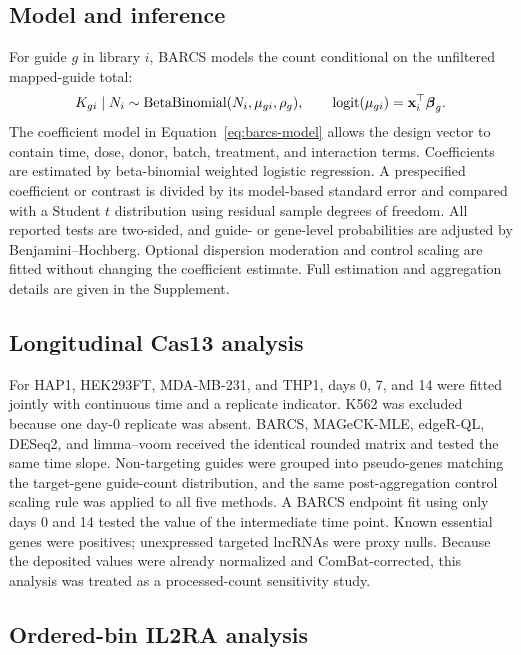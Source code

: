 \subsection{Model and inference}

For guide $g$ in library $i$, BARCS models the count conditional on the
unfiltered mapped-guide total:
\begin{equation}
K_{gi}\mid N_i\sim
\operatorname{BetaBinomial}(N_i,\mu_{gi},\rho_g),
\qquad
\operatorname{logit}(\mu_{gi})=\mathbf{x}_i^\top\boldsymbol{\beta}_g .
\label{eq:barcs-model}
\end{equation}
The coefficient model in Equation~\eqref{eq:barcs-model} allows the design
vector to contain time, dose, donor, batch, treatment, and
interaction terms.  Coefficients are estimated by beta-binomial weighted
logistic regression.  A prespecified coefficient or contrast is divided by
its model-based standard error and compared with a Student $t$ distribution
using residual sample degrees of freedom.  All reported tests are two-sided,
and guide- or gene-level probabilities are adjusted by Benjamini--Hochberg.
Optional dispersion moderation and control scaling are fitted without changing
the coefficient estimate.  Full estimation and aggregation details are given
in the Supplement.

\subsection{Longitudinal Cas13 analysis}

For HAP1, HEK293FT, MDA-MB-231, and THP1, days 0, 7, and 14 were fitted
jointly with continuous time and a replicate indicator.  K562 was excluded
because one day-0 replicate was absent.  BARCS, MAGeCK-MLE, edgeR-QL, DESeq2,
and limma--voom received the identical rounded matrix and tested the same time
slope.  Non-targeting guides were grouped into pseudo-genes matching the
target-gene guide-count distribution, and the same post-aggregation control
scaling rule was applied to all five methods.  A BARCS endpoint fit using only
days 0 and 14 tested the value of the intermediate time point.  Known
essential genes were positives; unexpressed targeted lncRNAs
were proxy nulls.  Because the deposited values were already normalized and
ComBat-corrected, this analysis was treated as a processed-count sensitivity
study.

\subsection{Ordered-bin IL2RA analysis}


